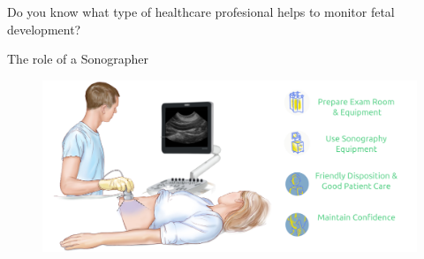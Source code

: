 {
\begin{frame}{}

\BigSizeFont
\begin{center}
    Do you know what type of healthcare profesional helps to monitor fetal development?
\end{center}

\end{frame}
}


{
    \begin{frame}{The role of a Sonographer}
      \begin{figure}
        \centering
        \includegraphics[width=1.0\textwidth]{./../figures/sonographer/versions/drawing-v02.png}
      \end{figure}
\end{frame}
}